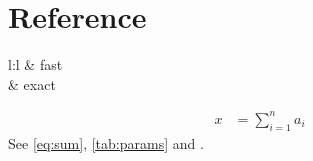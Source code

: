 \chapter{Reference}\label{ch:reference}
\begin{table}[htb]\centering\caption{Options}\label{tab:opts}
\begin{tabular}{l:l}\hline {} & fast\\ & exact\\\hline\end{tabular}\end{table}
\begin{align} x &= \sum_{i=1}^n a_i \label{eq:sum}\end{align}
See \autoref{eq:sum}, \autoref{tab:params} and \cite{lamport94}.
